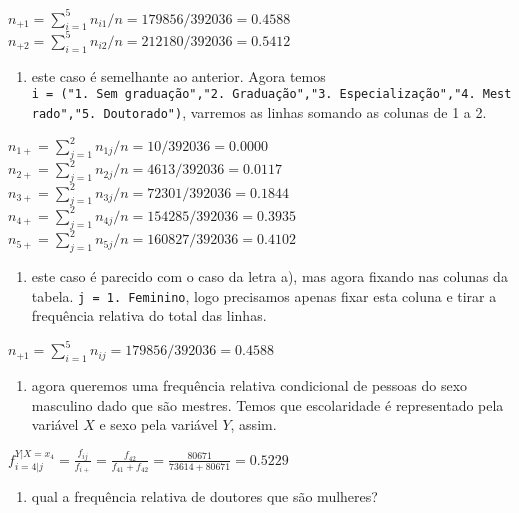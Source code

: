 \documentclass[11pt,]{style/krantz}
\providecommand{\tightlist}{%
  \setlength{\itemsep}{0pt}\setlength{\parskip}{0pt}}
\theoremstyle{definition}
\theoremstyle{definition}
\theoremstyle{definition}
\theoremstyle{remark}
\begin{document}
\(n_{+1} = \sum_{i=1}^5 n_{i1} / n = 179856 / 392036 = 0.4588\)\\
\(n_{+2} = \sum_{i=1}^5 n_{i2} / n = 212180 / 392036 = 0.5412\)

\begin{enumerate}
\def\labelenumi{(\alph{enumi})}
\setcounter{enumi}{2}
\tightlist
\item
  este caso é semelhante ao anterior.
  Agora temos \texttt{i\ =\ ("1.\ Sem\ graduação","2.\ Graduação","3.\ Especialização","4.\ Mestrado","5.\ Doutorado")}, varremos as linhas somando as colunas de 1 a 2.
\end{enumerate}

\(n_{1+} = \sum_{j=1}^2 n_{1j} / n = 10 / 392036 = 0.0000\)\\
\(n_{2+} = \sum_{j=1}^2 n_{2j} / n = 4613 / 392036 = 0.0117\)\\
\(n_{3+} = \sum_{j=1}^2 n_{3j} / n = 72301 / 392036 = 0.1844\)\\
\(n_{4+} = \sum_{j=1}^2 n_{4j} / n = 154285 / 392036 = 0.3935\)\\
\(n_{5+} = \sum_{j=1}^2 n_{5j} / n = 160827 / 392036 = 0.4102\)

\begin{enumerate}
\def\labelenumi{(\alph{enumi})}
\setcounter{enumi}{3}
\tightlist
\item
  este caso é parecido com o caso da letra a), mas agora fixando nas colunas da tabela.
  \texttt{j\ =\ 1.\ Feminino}, logo precisamos apenas fixar esta coluna e tirar a frequência relativa do total das linhas.
\end{enumerate}

\(n_{+1} = \sum_{i=1}^5 n_{ij} = 179856 / 392036 = 0.4588\)

\begin{enumerate}
\def\labelenumi{(\alph{enumi})}
\setcounter{enumi}{4}
\tightlist
\item
  agora queremos uma frequência relativa condicional de pessoas do sexo masculino dado que são mestres.
  Temos que escolaridade é representado pela variável \(X\) e sexo pela variável \(Y\), assim.
\end{enumerate}

\(f_{i=4|j}^{Y|X=x_4} = \frac{f_{ij}}{f_{i+}} = \frac{f_{42}}{f_{41}+f_{42}} = \frac{80671}{73614 + 80671} = 0.5229\)

\begin{enumerate}
\def\labelenumi{(\alph{enumi})}
\setcounter{enumi}{5}
\tightlist
\item
  qual a frequência relativa de doutores que são mulheres?
\end{enumerate}
\end{document}
